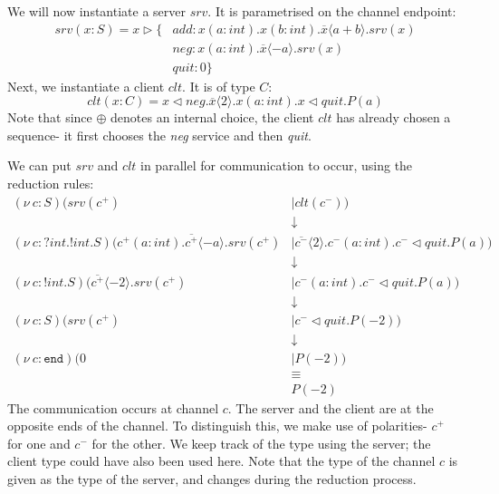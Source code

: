 \documentclass[a4paper, openany]{memoir}
\theoremstyle{definition}
\begin{document}
    We will now instantiate a server $srv$. It is parametrised on the channel endpoint:
    \begin{align*}
        srv(x \colon S) = x \vartriangleright \{ &\textit{add} \colon x(a \colon \textit{int}). x(b \colon\textit{int}). \overline{x} \langle a + b \rangle. srv(x) \\
        & \textit{neg} \colon x(a \colon \textit{int}). \overline{x}\langle -a \rangle. srv(x) \\
        & \textit{quit} \colon 0 \}
    \end{align*}
    Next, we instantiate a client $clt$. It is of type $C$:
    \[clt(x \colon C) = x \vartriangleleft \textit{neg}.\overline{x} \langle 2 \rangle.x(a \colon \textit{int}).x \vartriangleleft \textit{quit}.P(a)\]
    Note that since $\oplus$ denotes an internal choice, the client $clt$ has already chosen a sequence- it first chooses the \textit{neg} service and then \textit{quit}.

    We can put $srv$ and $clt$ in parallel for communication to occur, using the reduction rules:
    \begin{align*}
        (\nu \ c \colon S)(srv(c^+) &\mid clt(c^-)) \\
        &\downarrow \\
        (\nu \ c \colon ?\textit{int}.!\textit{int}.S)(c^+(a \colon \textit{int}).\overline{c^+}\langle -a \rangle.srv(c^+) &\mid \overline{c^-}\langle 2 \rangle. c^-(a \colon \textit{int}).c^{-} \vartriangleleft \textit{quit}.P(a)) \\
        &\downarrow \\
        (\nu \ c \colon !\textit{int}.S)(\overline{c^+}\langle -2 \rangle.srv(c^+) &\mid c^-(a \colon \textit{int}). c^- \vartriangleleft \textit{quit}.P(a)) \\
        &\downarrow \\
        (\nu \ c \colon S)(srv(c^+) &\mid c^- \vartriangleleft \textit{quit}.P(-2)) \\
        &\downarrow \\
        (\nu \ c \colon \texttt{end})(0 &\mid P(-2)) \\
        &\equiv \\
        & P(-2)
    \end{align*}
    The communication occurs at channel $c$. The server and the client are at the opposite ends of the channel. To distinguish this, we make use of polarities- $c^+$ for one and $c^-$ for the other. We keep track of the type using the server; the client type could have also been used here. Note that the type of the channel $c$ is given as the type of the server, and changes during the reduction process.
\end{document}
